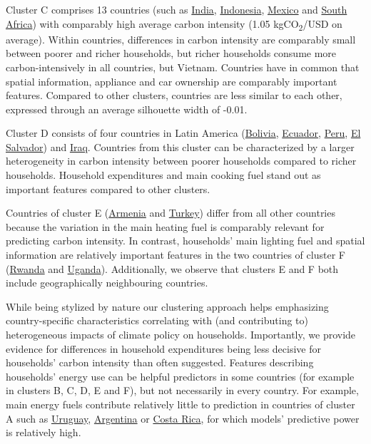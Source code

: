\documentclass[12pt, a4paper]{article}
\begin{document}
Cluster C comprises 13 countries (such as \hyperref[fig:5b_IND]{India}, \hyperref[fig:5b_IDN]{Indonesia}, \hyperref[fig:5b_MEX]{Mexico} and \hyperref[fig:5b_ZAF]{South Africa}) with comparably high average carbon intensity (1.05 kgCO\textsubscript{2}/USD on average). Within countries, differences in carbon intensity are comparably small between poorer and richer households, but richer households consume more carbon-intensively in all countries, but Vietnam. Countries have in common that spatial information, appliance and car ownership are comparably important features. Compared to other clusters, countries are less similar to each other, expressed through an average silhouette width of -0.01. 

Cluster D consists of four countries in Latin America (\hyperref[fig:5b_BOL]{Bolivia}, \hyperref[fig:5b_ECU]{Ecuador}, \hyperref[fig:5b_PER]{Peru}, \hyperref[fig:5b_SLV]{El Salvador}) and \hyperref[fig:5b_IRQ]{Iraq}. Countries from this cluster can be characterized by a larger heterogeneity in carbon intensity between poorer households compared to richer households. Household expenditures and main cooking fuel stand out as important features compared to other clusters. 

Countries of cluster E (\hyperref[fig:5b_ARM]{Armenia} and \hyperref[fig:5b_TUR]{Turkey}) differ from all other countries because the variation in the main heating fuel is comparably relevant for predicting carbon intensity. In contrast, households' main lighting fuel and spatial information are relatively important features in the two countries of cluster F (\hyperref[fig:5b_RWA]{Rwanda} and \hyperref[fig:5b_UGA]{Uganda}). Additionally, we observe that clusters E and F both include geographically neighbouring countries.

While being stylized by nature our clustering approach helps emphasizing country-specific characteristics correlating with (and contributing to) heterogeneous impacts of climate policy on households. Importantly, we provide evidence for differences in household expenditures being less decisive for households' carbon intensity than often suggested. Features describing households' energy use can be helpful predictors in some countries (for example in clusters B, C, D, E and F), but not necessarily in every country. For example, main energy fuels contribute relatively little to prediction in countries of cluster A such as \hyperref[fig:5b_URY]{Uruguay}, \hyperref[fig:5b_URY]{Argentina} or \hyperref[fig:5b_CRI]{Costa Rica}, for which models' predictive power is relatively high.
\end{document}
